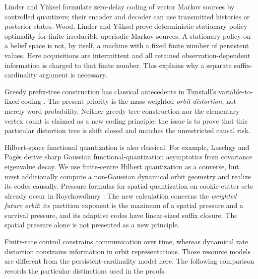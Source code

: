 Linder and Y\"uksel \cite{LinderYuksel2014} formulate zero-delay
coding of vector Markov sources by controlled quantizers; their
encoder and decoder can use transmitted histories or posterior
states. Wood, Linder and Y\"uksel \cite[Theorem~3]{WoodLinderYuksel2017}
prove deterministic stationary policy optimality for finite
irreducible aperiodic Markov sources. A stationary policy on a
belief space is not, by itself, a machine with a fixed finite number
of persistent values. Here acquisitions are intermittent and all
retained observation-dependent information is charged to that finite
number. This explains why a separate suffix-cardinality argument is
necessary.

Greedy prefix-tree construction has classical antecedents in
Tunstall's variable-to-fixed coding \cite{Tunstall1967}. The present
priority is the mass-weighted \emph{orbit distortion}, not merely
word probability. Neither greedy tree construction nor the elementary
vertex count is claimed as a new coding principle; the issue is to
prove that this particular distortion tree is shift closed and
matches the unrestricted causal risk.

Hilbert-space functional quantization is also classical. For example,
Luschgy and Pag\`es \cite{LuschgyPages2004} derive sharp Gaussian
functional-quantization asymptotics from covariance eigenvalue
decay. We use finite-centre Hilbert quantization as a converse, but
must additionally compute a non-Gaussian dynamical orbit geometry
and realize its codes causally. Pressure formulas for spatial
quantization on cookie-cutter sets already occur in
Roychowdhury \cite{Roychowdhury2014}. The new calculation concerns
the \emph{weighted future orbit}: its partition exponent is the
maximum of a spatial pressure and a survival pressure, and its
adaptive codes have linear-sized suffix closure. The spatial
pressure alone is not presented as a new principle.

Finite-rate control \cite{NairEvans2000,TatikondaMitter2004,MatveevSavkin2009}
constrains communication over time, whereas dynamical rate distortion
\cite{LindenstraussTsukamoto2018} constrains information in orbit
representations. Those resource models are different from the
persistent-cardinality model here. The following comparison records
the particular distinctions used in the proofs.

